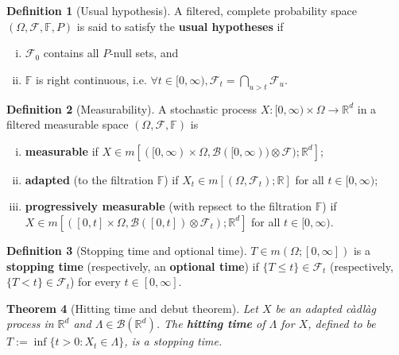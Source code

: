 \documentclass[openany,oneside]{book}
\newtheorem{thm}{Theorem}[section]
\theoremstyle{definition}
\newtheorem{defn}[thm]{Definition}
\theoremstyle{remark}
\newcommand{\R}{{\mathbb R}}%
\begin{document}
\begin{defn}[Usual hypothesis]
A filtered, complete probability space $(\Omega,\mathcal{F},\mathbb{F},P)$ is said to satisfy the \textbf{usual hypotheses} if
\begin{enumerate}[(i)]
	\item $\mathcal{F}_0$ contains all $P$-null sets, and
    \item $\mathbb{F}$ is right continuous, i.e. $\forall t\in[0,\infty),\mathcal{F}_t=\bigcap_{u>t}\mathcal{F}_u$.
\end{enumerate}
\end{defn}

\begin{defn}[Measurability]
A stochastic process $X:[0,\infty)\times\Omega \to \R^d$ in a filtered measurable space $(\Omega, \mathcal{F}, \mathbb{F})$ is
\begin{enumerate}[(i)]
\item \textbf{measurable} if $X\in m\left[([0,\infty) \times \Omega, \mathcal{B}([0,\infty)) \otimes \mathcal{F}); \R^d \right]$;
\item \textbf{adapted} (to the filtration $\mathbb{F}$) if $X_t\in m[(\Omega,\mathcal{F}_t);\R]$ for all $t\in[0,\infty)$;
\item \textbf{progressively measurable} (with repsect to the filtration $\mathbb{F}$) if $X\in m\left[([0,t] \times \Omega, \mathcal{B}([0,t]) \otimes \mathcal{F}_t); \R^d \right]$ for all $t\in[0,\infty)$.
\end{enumerate}
\end{defn}


\begin{defn}[Stopping time and optional time]
$T\in m(\Omega;[0,\infty])$ is a \textbf{stopping time} (respectively, an \textbf{optional time}) if $\{T\leq t\}\in\mathcal{F}_t$ (respectively, $\{T < t\}\in\mathcal{F}_t$) for every $t\in[0,\infty]$.
\end{defn}


\begin{thm}[Hitting time and debut theorem]
Let $X$ be an adapted c\`adl\`ag process in $\R^d$ and $\Lambda \in \mathcal{B}(\R^d)$. The \textbf{hitting time} of $\Lambda$ for $X$, defined to be $T:=\inf\{t>0 : X_t\in\Lambda\}$, is a stopping time.
\end{thm}
\end{document}

